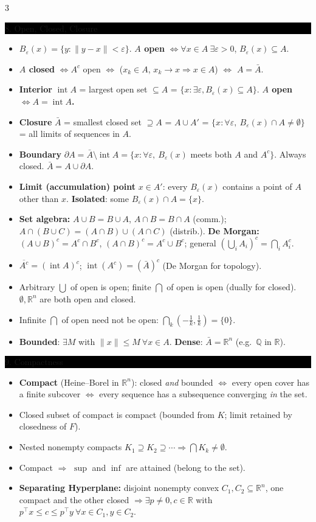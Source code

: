\documentclass[8pt,letterpaper]{article}
\makeatletter
\newcommand{\sect}[1]{%
  \vspace{2.2pt}%
  \noindent\colorbox{black}{\parbox{\dimexpr\linewidth-2\fboxsep}{%
    \color{white}\bfseries\scshape\fontsize{6.4}{7.4}\selectfont
    \hyphenpenalty=10000\exhyphenpenalty=10000\raggedright #1}}%
  \vspace{1.4pt}\par\nopagebreak\@afterheading}
\newenvironment{tl}
  {\begin{itemize}[leftmargin=6pt,itemsep=0.3pt,topsep=1pt,parsep=0pt,
                   partopsep=0pt,label=\textcolor{gray}{\tiny$\bullet$}]}
  {\end{itemize}}
\newcommand{\R}{\mathbb{R}}
\newcommand{\Rn}{\mathbb{R}^n}
\newcommand{\intr}{\operatorname{int}}
\newcommand{\tp}{^{\!\top}}
\newcommand{\nm}[1]{\lVert #1\rVert}
\makeatother
\begin{document}
\begin{multicols}{3}
\sect{8. Open, Closed, Closure}
\begin{tl}
\item $B_\varepsilon(x)=\{y:\nm{y-x}<\varepsilon\}$. \textbf{$A$ open} $\iff\forall x\in A\ \exists\varepsilon>0$, $B_\varepsilon(x)\subseteq A$.
\item \textbf{$A$ closed} $\iff A^c$ open $\iff$ ($x_k\in A$, $x_k\to x\Rightarrow x\in A$) $\iff$ \textbf{$A=\bar A$}.
\item \textbf{Interior} $\intr A$ = largest open set $\subseteq A$ = $\{x: \exists\varepsilon, B_\varepsilon(x)\subseteq A\}$. \textbf{$A$ open $\iff A=\intr A$.}
\item \textbf{Closure} $\bar A$ = smallest closed set $\supseteq A$ = $A\cup A'$ = $\{x: \forall\varepsilon,\ B_\varepsilon(x)\cap A\ne\emptyset\}$ = all limits of sequences in $A$.
\item \textbf{Boundary} $\partial A=\bar A\setminus\intr A=\{x:\forall\varepsilon,\ B_\varepsilon(x)$ meets both $A$ and $A^c\}$. Always closed. $\bar A=A\cup\partial A$.
\item \textbf{Limit (accumulation) point} $x\in A'$: every $B_\varepsilon(x)$ contains a point of $A$ other than $x$. \textbf{Isolated}: some $B_\varepsilon(x)\cap A=\{x\}$.
\item \textbf{Set algebra:} $A\cup B=B\cup A$, $A\cap B=B\cap A$ (comm.); $A\cap(B\cup C)=(A\cap B)\cup(A\cap C)$ (distrib.). \textbf{De Morgan:} $(A\cup B)^c=A^c\cap B^c$, $(A\cap B)^c=A^c\cup B^c$; general $\left(\bigcup_iA_i\right)^c=\bigcap_iA_i^c$.
\item $\overline{A^c}=(\intr A)^c$; $\intr(A^c)=(\bar A)^c$ (De Morgan for topology).
\item Arbitrary $\bigcup$ of open is open; finite $\bigcap$ of open is open (dually for closed). $\emptyset,\Rn$ are both open and closed.
\item \colorbox{black!12}{Infinite $\bigcap$ of open need not be open:} $\bigcap_k(-\frac1k,\frac1k)=\{0\}$.
\item \textbf{Bounded}: $\exists M$ with $\nm{x}\le M\ \forall x\in A$. \textbf{Dense}: $\bar A=\Rn$ (e.g.\ $\mathbb Q$ in $\R$).
\end{tl}

\sect{9. Compactness}
\begin{tl}
\item \textbf{Compact} (Heine--Borel in $\Rn$): closed \emph{and} bounded $\iff$ every open cover has a finite subcover $\iff$ every sequence has a subsequence converging \emph{in} the set.
\item Closed subset of compact is compact (bounded from $K$; limit retained by closedness of $F$).
\item Nested nonempty compacts $K_1\supseteq K_2\supseteq\cdots\Rightarrow\bigcap K_k\neq\emptyset$.
\item Compact $\Rightarrow$ $\sup$ and $\inf$ are attained (belong to the set).
\item \textbf{Separating Hyperplane:} disjoint nonempty convex $C_1,C_2\subseteq\Rn$, one compact and the other closed $\Rightarrow\exists p\neq0,c\in\R$ with $p\tp x\le c\le p\tp y\ \forall x\in C_1,y\in C_2$.
\end{tl}


\end{multicols}
\end{document}
